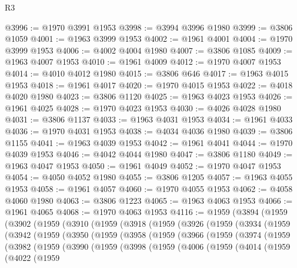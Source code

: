 \begin{lexlean}{R3}
\begin{coremodule}
@3996 := @1970 @3991 @1953
@3998 := @3994 @3996 @1980
@3999 := @3806 @1059
@4001 := @1963 @3999 @1953
@4002 := @1961 @4001
@4004 := @1970 @3999 @1953
@4006 := @4002 @4004 @1980
@4007 := @3806 @1085
@4009 := @1963 @4007 @1953
@4010 := @1961 @4009
@4012 := @1970 @4007 @1953
@4014 := @4010 @4012 @1980
@4015 := @3806 @646
@4017 := @1963 @4015 @1953
@4018 := @1961 @4017
@4020 := @1970 @4015 @1953
@4022 := @4018 @4020 @1980
@4023 := @3806 @1120
@4025 := @1963 @4023 @1953
@4026 := @1961 @4025
@4028 := @1970 @4023 @1953
@4030 := @4026 @4028 @1980
@4031 := @3806 @1137
@4033 := @1963 @4031 @1953
@4034 := @1961 @4033
@4036 := @1970 @4031 @1953
@4038 := @4034 @4036 @1980
@4039 := @3806 @1155
@4041 := @1963 @4039 @1953
@4042 := @1961 @4041
@4044 := @1970 @4039 @1953
@4046 := @4042 @4044 @1980
@4047 := @3806 @1180
@4049 := @1963 @4047 @1953
@4050 := @1961 @4049
@4052 := @1970 @4047 @1953
@4054 := @4050 @4052 @1980
@4055 := @3806 @1205
@4057 := @1963 @4055 @1953
@4058 := @1961 @4057
@4060 := @1970 @4055 @1953
@4062 := @4058 @4060 @1980
@4063 := @3806 @1223
@4065 := @1963 @4063 @1953
@4066 := @1961 @4065
@4068 := @1970 @4063 @1953
@4116 := @1959
    (@3894
      (@1959
        (@3902
          (@1959
            (@3910
              (@1959
                (@3918
                  (@1959
                    (@3926
                      (@1959
                        (@3934
                          (@1959
                            (@3942
                              (@1959
                                (@3950
                                  (@1959
                                    (@3958
                                      (@1959
                                        (@3966
                                          (@1959
                                            (@3974
                                              (@1959
                                                (@3982
                                                  (@1959
                                                    (@3990
                                                      (@1959
                                                        (@3998
                                                          (@1959
                                                            (@4006
                                                              (@1959
                                                                (@4014
                                                                  (@1959
                                                                    (@4022
                                                                      (@1959

\end{coremodule}
\end{lexlean}
